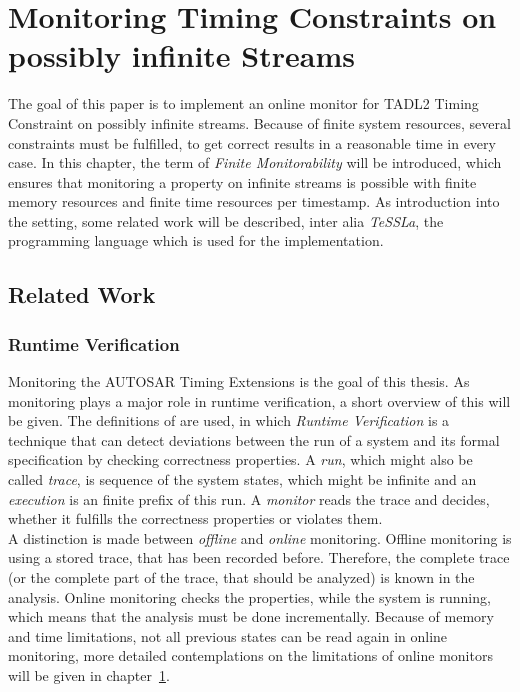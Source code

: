 
\chapter{Monitoring Timing Constraints on possibly infinite Streams}
\label{chapter-monitorability}
	The goal of this paper is to implement an online monitor for TADL2 Timing Constraint on possibly infinite streams. Because of finite system resources, several constraints must be fulfilled, to get correct results in a reasonable time in every case. In this chapter, the term of \emph{Finite Monitorability} will be introduced, which ensures that monitoring a property on infinite streams is possible with finite memory resources and finite time resources per timestamp. As introduction into the setting, some related work will be described, inter alia \emph{TeSSLa}, the programming language which is used for the implementation.

\section{Related Work}

	\subsection{Runtime Verification}
		Monitoring the AUTOSAR Timing Extensions is the goal of this thesis. As monitoring plays a major role in runtime verification, a short overview of this will be given. The definitions of \cite{RuntimeVerification} are used, in which \emph{Runtime Verification} is a technique that can detect deviations between the run of a system and its formal specification by checking correctness properties. A \emph{run}, which might also be called \emph{trace}, is sequence of the system states, which might be infinite and an \emph{execution} is an finite prefix of this run. A \emph{monitor} reads the trace and decides, whether it fulfills the correctness properties or violates them.\\
		A distinction is made between \emph{offline} and \emph{online} monitoring. Offline monitoring is using a stored trace, that has been recorded before. Therefore, the complete trace (or the complete part of the trace, that should be analyzed) is known in the analysis. Online monitoring checks the properties, while the system is running, which means that the analysis must be done incrementally. Because of memory and time limitations, not all previous states can be read again in online monitoring, more detailed contemplations on the limitations of online monitors will be given in chapter~\ref{chapter-monitorability}.
	
